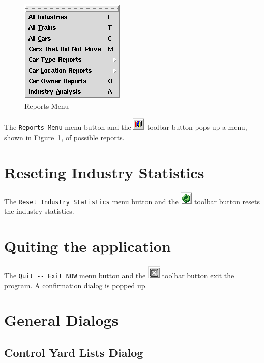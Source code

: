 \begin{figure}[hbpt]
\begin{centering}
\includegraphics{FCFReportsMenu.png}
\caption{Reports Menu}
\label{fig:fcf:reportsmenu}
\end{centering}
\end{figure}
The \verb=Reports Menu= menu button and the
\includegraphics{FCFReportsTool.png} toolbar button pops up a menu,
shown in Figure~\ref{fig:fcf:reportsmenu}, of
possible reports.

\section{Reseting Industry Statistics}

The \verb=Reset Industry Statistics= menu button and the
\includegraphics{FCFResetStatsTool.png} toolbar button resets the
industry statistics.

\section{Quiting the application}

The \verb=Quit -- Exit NOW= menu button and the
\includegraphics{FCFCloseTool.png} toolbar button exit the program. A
confirmation dialog is popped up.


\section{General Dialogs}

\subsection{Control Yard Lists Dialog}

